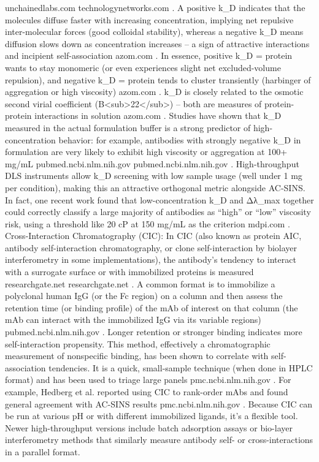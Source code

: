 unchainedlabs.com
technologynetworks.com
. A positive k_D indicates that the molecules diffuse faster with increasing concentration, implying net repulsive inter-molecular forces (good colloidal stability), whereas a negative k_D means diffusion slows down as concentration increases – a sign of attractive interactions and incipient self-association
azom.com
. In essence, positive k_D = protein wants to stay monomeric (or even experiences slight net excluded-volume repulsion), and negative k_D = protein tends to cluster transiently (harbinger of aggregation or high viscosity)
azom.com
. k_D is closely related to the osmotic second virial coefficient (B<sub>22</sub>) – both are measures of protein-protein interactions in solution
azom.com
. Studies have shown that k_D measured in the actual formulation buffer is a strong predictor of high-concentration behavior: for example, antibodies with strongly negative k_D in formulation are very likely to exhibit high viscosity or aggregation at 100+ mg/mL
pubmed.ncbi.nlm.nih.gov
pubmed.ncbi.nlm.nih.gov
. High-throughput DLS instruments allow k_D screening with low sample usage (well under 1 mg per condition), making this an attractive orthogonal metric alongside AC-SINS. In fact, one recent work found that low-concentration k_D and Δλ_max together could correctly classify a large majority of antibodies as “high” or “low” viscosity risk, using a threshold like 20 cP at 150 mg/mL as the criterion
mdpi.com
.
Cross-Interaction Chromatography (CIC): In CIC (also known as protein AIC, antibody self-interaction chromatography, or clone self-interaction by biolayer interferometry in some implementations), the antibody’s tendency to interact with a surrogate surface or with immobilized proteins is measured
researchgate.net
researchgate.net
. A common format is to immobilize a polyclonal human IgG (or the Fc region) on a column and then assess the retention time (or binding profile) of the mAb of interest on that column (the mAb can interact with the immobilized IgG via its variable regions)
pubmed.ncbi.nlm.nih.gov
. Longer retention or stronger binding indicates more self-interaction propensity. This method, effectively a chromatographic measurement of nonspecific binding, has been shown to correlate with self-association tendencies. It is a quick, small-sample technique (when done in HPLC format) and has been used to triage large panels
pmc.ncbi.nlm.nih.gov
. For example, Hedberg et al. reported using CIC to rank-order mAbs and found general agreement with AC-SINS results
pmc.ncbi.nlm.nih.gov
. Because CIC can be run at various pH or with different immobilized ligands, it’s a flexible tool. Newer high-throughput versions include batch adsorption assays or bio-layer interferometry methods that similarly measure antibody self- or cross-interactions in a parallel format.
